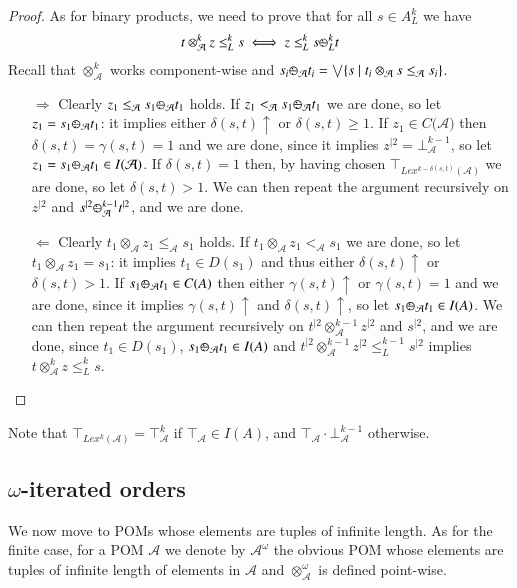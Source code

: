 \documentclass[a4paper]{elsarticle}
\newcommand{\1}{\mathbf{1}}
\def\odiv{{ \ominus\hspace{-8pt}:}\;}
\begin{document}
\begin{proof}
As for binary products, we need to prove that for all $s \in A^k_L$ we have
$$t \otimes^k_\mathcal{A} z \leq^k_L s \iff z \leq^k_L s \odiv^k_L t$$
%
Recall that $\otimes^k_\mathcal{A}$ works component-wise and 
$s_i \odiv_\mathcal{A} t_i = \bigvee \{s \mid t_i \otimes_\mathcal{A} s \leq_\mathcal{A} s_i\}$.

\begin{itemize}
\item[$\Rightarrow$] Clearly $z_1 \leq_\mathcal{A} s_1 \odiv_\mathcal{A} t_1$ holds.
If $z_1 <_\mathcal{A} s_1 \odiv_\mathcal{A} t_1$ we are done, so let 
$z_1 = s_1 \odiv_\mathcal{A} t_1$: it implies either $\delta(s,t)\uparrow$ or $\delta(s,t) \geq 1$.
If $z_1 \in C(\mathcal{A)}$ then $\delta(s,t) = \gamma(s,t) = 1$ and we are done, 
since it implies $z^{\mid 2} = \bot^{k-1}_\mathcal{A}$, so let $z_1 = s_1 \odiv_\mathcal{A} t_1 \in I(\mathcal{A)}$.
If $\delta(s,t) = 1$ then, by having chosen $\top_{Lex^{k-\delta(s,t)}(\mathcal{A})}$ we are done, so let $\delta(s,t) > 1$.
We can then repeat the argument recursively on $z^{\mid 2}$ and $s^{\mid 2} \odiv^{k-1}_\mathcal{A} t^{\mid 2}$, 
and we are done.

\item[$\Leftarrow$]
Clearly $t_1 \otimes_\mathcal{A} z_1 \leq_\mathcal{A} s_1$ holds.
If $t_1 \otimes_\mathcal{A} z_1 <_\mathcal{A} s_1$ we are done, so let 
$t_1 \otimes_\mathcal{A} z_1 = s_1$: it implies $t_1 \in D(s_1)$ and thus either $\delta(s,t)\uparrow$ or $\delta(s,t) > 1$.
If $s_1 \odiv_\mathcal{A} t_1 \in C(A)$ then either $\gamma(s,t) \uparrow$ or $\gamma(s,t)=1$
and we are done, since it implies $\gamma(s,t)\uparrow$ and $\delta(s,t)\uparrow$,
so let $s_1 \odiv_\mathcal{A} t_1 \in I(A)$.
We can then repeat the argument recursively on $t^{\mid 2} \otimes^{k-1}_\mathcal{A} z^{\mid 2}$ and
$s^{\mid 2}$, and we are done,
since $t_1 \in D(s_1)$,
$s_1 \odiv_\mathcal{A} t_1 \in I(A)$ 
and $t^{\mid 2} \otimes^{k-1}_\mathcal{A} z^{\mid 2} \leq^{k-1}_L s^{\mid 2}$
implies 
$t \otimes^k_\mathcal{A} z \leq^k_L s$.
\end{itemize}
\end{proof}

Note that $\top_{Lex^k(\mathcal{A})} = \top^k_\mathcal{A}$
if $\top_\mathcal{A} \in I(A)$, and  $\top_\mathcal{A} \cdot \bot^{k-1}_\mathcal{A}$ 
otherwise.

\subsection{$\omega$-iterated orders}\label{sec:infinite}
We now move to POMs whose elements are tuples of infinite length.
As for the finite case, for a POM $\mathcal{A}$ we denote by $\mathcal{A}^\omega$
the obvious POM whose elements are tuples of infinite length
of elements in $\mathcal{A}$ and $\otimes^\omega_\mathcal{A}$ is defined point-wise.
\end{document}

